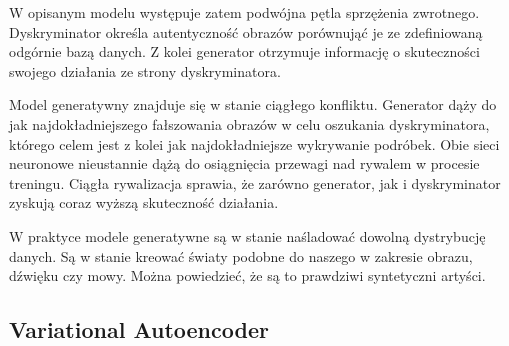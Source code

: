   W opisanym modelu występuje zatem podwójna pętla sprzężenia zwrotnego. Dyskryminator określa autentyczność obrazów porównująć je ze zdefiniowaną odgórnie bazą danych. Z kolei generator otrzymuje informację o skuteczności swojego działania ze strony dyskryminatora.

  Model generatywny znajduje się w stanie ciągłego konfliktu. Generator dąży do jak najdokładniejszego fałszowania obrazów w celu oszukania dyskryminatora, którego celem jest z kolei jak najdokładniejsze wykrywanie podróbek. Obie sieci neuronowe nieustannie dążą do osiągnięcia przewagi nad rywalem w procesie treningu. Ciągła rywalizacja sprawia, że zarówno generator, jak i dyskryminator zyskują coraz wyższą skuteczność działania.

  W praktyce modele generatywne są w stanie naśladować dowolną dystrybucję danych. Są w stanie kreować światy podobne do naszego w zakresie obrazu, dźwięku czy mowy. Można powiedzieć, że są to prawdziwi syntetyczni artyści.

  \subsection{Variational Autoencoder}
